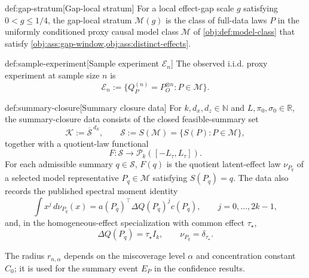 \documentclass[11pt]{article}
\begin{document}
\begin{definitionv}{def:gap-stratum}[Gap-local stratum]
For a local effect-gap scale \(g\) satisfying \(0<g\le 1/4\), the gap-local stratum \(\mathcal M(g)\) is the class of full-data laws \(P\) in the uniformly conditioned proxy causal model class \(\mathcal M\) of \cref{obj:def:model-class} that satisfy \cref{obj:ass:gap-window,obj:ass:distinct-effects}.
\end{definitionv}

\begin{definitionv}{def:sample-experiment}[Sample experiment \(\mathcal E_n\)]
The observed i.i.d. proxy experiment at sample size \(n\) is
\[
\mathcal E_n:=\{Q_P^{(n)}=P_O^{\otimes n}:P\in\mathcal M\}.
\]
\end{definitionv}

\begin{definitionv}{def:summary-closure}[Summary closure data]
For \(k,d_x,d_z\in\mathbb N\) and \(L,\pi_0,\sigma_0\in\mathbb R\), the summary-closure data consists of the closed feasible-summary set
\[
\mathcal K:=\overline{\mathscr S}^{\,d_S},
\qquad
\mathscr S:=S(\mathcal M)=\{S(P):P\in\mathcal M\},
\]
together with a quotient-law functional
\[
F:\mathscr S\to\mathcal P_k([-L_\tau,L_\tau]).
\]
For each admissible summary \(q\in\mathscr S\), \(F(q)\) is the quotient latent-effect law \(\nu_{P_q}\) of a selected model representative \(P_q\in\mathcal M\) satisfying \(S(P_q)=q\). The data also records the published spectral moment identity
\[
\int x^j\,d\nu_{P_q}(x)
=
a(P_q)^\top\Delta Q(P_q)^j c(P_q),
\qquad j=0,\ldots,2k-1,
\]
and, in the homogeneous-effect specialization with common effect \(\tau_\star\),
\[
\Delta Q(P_q)=\tau_\star I_k,
\qquad
\nu_{P_q}=\delta_{\tau_\star}.
\]
\end{definitionv}

The radius \(r_{n,\alpha}\) depends on the miscoverage level \(\alpha\) and concentration constant \(C_0\); it is used for the summary event \(E_P\) in the confidence results.
\end{document}
